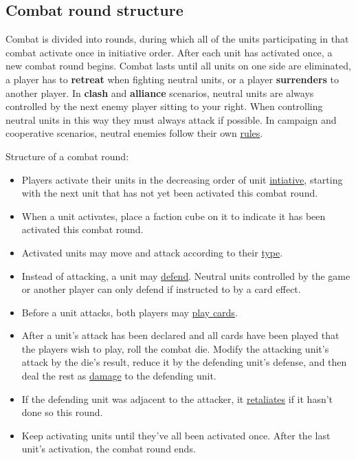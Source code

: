 \documentclass[12pt]{article}
\begin{document}
\subsection*{Combat round structure}
Combat is divided into rounds, during which all of the units participating in that combat activate once in initiative order. After each unit has activated once, a new combat round begins. Combat lasts until all units on one side are eliminated, a player has to \textbf{retreat} when fighting neutral units, or a player \textbf{surrenders} to another player. In \textbf{clash} and \textbf{alliance} scenarios, neutral units are always controlled by the next enemy player sitting to your right. When controlling neutral units in this way they must always attack if possible. In campaign and cooperative scenarios, neutral enemies follow their own \hyperlink{AIrules}{rules}.\par
Structure of a combat round:
\begin{itemize}
    \item Players activate their units in the decreasing order of unit \hyperlink{Initiative}{intiative}, starting with the next unit that has not yet been activated this combat round.
    \item When a unit activates, place a faction cube on it to indicate it has been activated this combat round.
    \item Activated units may move and attack according to their \hyperlink{Unittype}{type}.
    \item Instead of attacking, a unit may \hyperlink{Defend}{defend}. Neutral units controlled by the game or another player can only defend if instructed to by a card effect.
    \item Before a unit attacks, both players may \hyperlink{CombatCards}{play cards}. %
    \item After a unit's attack has been declared and all cards have been played that the players wish to play, roll the combat die. Modify the attacking unit's attack by the die's result, reduce it by the defending unit's defense, and then deal the rest as \hyperlink{HP}{damage} to the defending unit.
    \item If the defending unit was adjacent to the attacker, it \hyperlink{Retaliate}{retaliates} if it hasn't done so this round.
    \item Keep activating units until they've all been activated once. After the last unit's activation, the combat round ends.
\end{itemize}
\end{document}
